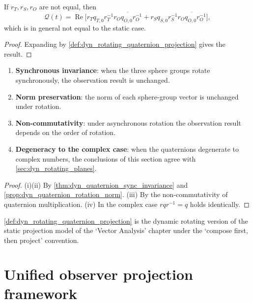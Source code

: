 \begin{corollary}\label{cor:dyn_quaternion_async}
If $r_T,r_S,r_O$ are not equal, then
\[
\mathcal Q(t)=\operatorname{Re}\!\big[r_T q_{T,0}r_T^{-1}\overline{r_O q_{O,0}r_O^{-1}}+r_S q_{S,0}r_S^{-1}\overline{r_O q_{O,0}r_O^{-1}}\big],
\]
which is in general not equal to the static case.
\end{corollary}

\begin{proof}
Expanding by \cref{def:dyn_rotating_quaternion_projection} gives the result.
\end{proof}

\begin{property}\label{prop:dyn_rotating_quaternion_properties}
\begin{enumerate}[label=(\roman*)]
    \item \textbf{Synchronous invariance}: when the three sphere groups rotate synchronously, the observation result is unchanged.
    \item \textbf{Norm preservation}: the norm of each sphere-group vector is unchanged under rotation.
    \item \textbf{Non-commutativity}: under asynchronous rotation the observation result depends on the order of rotation.
    \item \textbf{Degeneracy to the complex case}: when the quaternions degenerate to complex numbers, the conclusions of this section agree with \cref{sec:dyn_rotating_planes}.
\end{enumerate}
\end{property}

\begin{proof}
(i)(ii) By \cref{thm:dyn_quaternion_sync_invariance} and \cref{prop:dyn_quaternion_rotation_norm}. (iii) By the non-commutativity of quaternion multiplication. (iv) In the complex case $rqr^{-1}=q$ holds identically.
\end{proof}

\begin{remark}\label{rem:dyn_rotating_quaternion_static_relation}
\cref{def:dyn_rotating_quaternion_projection} is the dynamic rotating version of the static projection model of the `Vector Analysis' chapter under the `compose first, then project' convention.
\end{remark}

\section{Unified observer projection framework}
\label{sec:dyn_unified}

